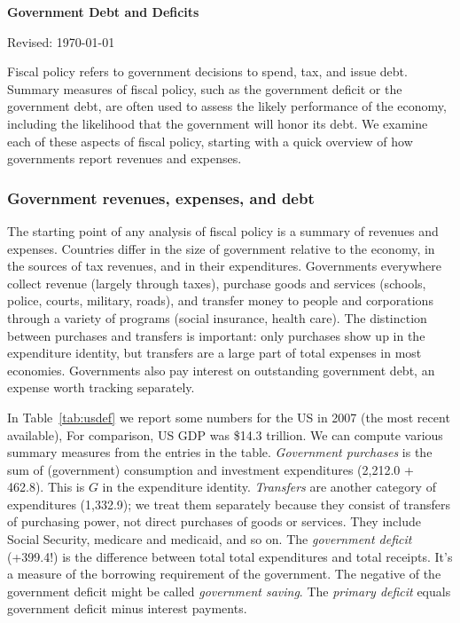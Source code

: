 \documentclass[letterpaper,12pt]{article}
\def\HeadName{Government Debt and Deficits}
\begin{document}
\thispagestyle{empty}%
\Head

\centerline{\large \bf \HeadName}%
\centerline{Revised: \today}

\bigskip
Fiscal policy refers to government decisions to spend, tax, and issue debt.  Summary measures of fiscal policy, such as the government deficit or the government debt, are often used to assess the
likely performance of the economy, including  
the likelihood that the government will honor its debt.  
We examine each of these aspects of fiscal policy, starting with
a quick overview of how governments report revenues and expenses.  


\subsubsection*{Government revenues, expenses, and debt}

The starting point of any analysis of fiscal policy is a summary 
of revenues and expenses.  
Countries differ in the size of government relative to the economy, 
in the sources of tax revenues, 
and in their expenditures.  
Governments everywhere collect revenue (largely through taxes), 
purchase goods and services (schools, police, courts, military, roads), 
and transfer money to people and corporations through a variety of
programs (social insurance, health care).  
The distinction between purchases and transfers is important:  
only purchases show up in the expenditure identity, 
but transfers are a large part of total expenses in most economies.  
Governments also pay interest on outstanding government debt, 
an expense worth tracking separately.  


In Table~\ref{tab:usdef}
we report some numbers for the US in 2007 (the most recent available), 
For comparison, US GDP was \$14.3 trillion.
We can compute various summary measures from the entries in the
table.  {\it Government purchases\/} is the sum of (government)
consumption and investment expenditures (2,212.0 + 462.8). 
This is $G$ in the expenditure identity. 
{\it Transfers\/} are another category of expenditures (1,332.9); 
we treat them separately because
they consist of transfers of purchasing power, not direct purchases
of goods or services. They include Social Security, medicare and medicaid, 
and so on. 
The {\it government deficit\/} (+399.4!) is the difference between total
total expenditures and total receipts. It's a measure of the borrowing requirement of the government.  
The negative of the government deficit might be called 
{\it government saving\/}.  
The {\it primary deficit\/} equals
government deficit minus interest payments.  
\end{document}
